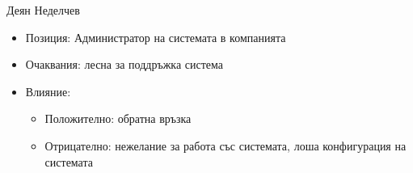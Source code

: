 \documentclass{beamer}
\begin{document}
\begin{frame}
    \begin{block}{Деян Неделчев}
        \begin{itemize}
            \item Позиция: Администратор на системата в компанията
            \item Очаквания: лесна за поддръжка система
            \item Влияние:
                \begin{itemize}
                    \item Положително: обратна връзка
                    \item Отрицателно: нежелание за работа със системата,
                        лоша конфигурация на системата
                \end{itemize}
        \end{itemize}

    \end{block}
\end{frame}
\end{document}
